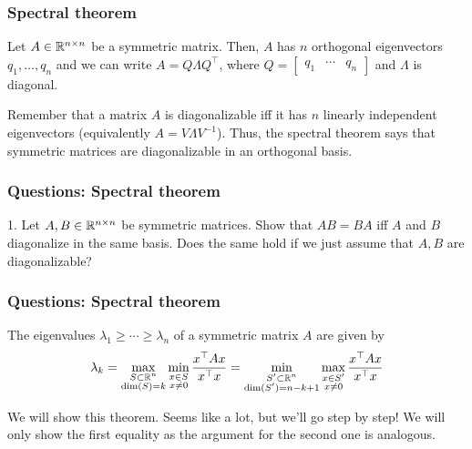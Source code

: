 \documentclass{beamer}
\begin{document}
\begin{frame}[t]
\frametitle{Spectral theorem}
\begin{theorem}
Let $A \in \mathbb{R}^{n \times n}$ be a symmetric matrix. Then, $A$ has $n$ orthogonal eigenvectors $q_1, \dots, q_n$ and we can write $A = Q \Lambda Q^\top$, where $Q = \begin{bmatrix} q_1 & \cdots & q_n \end{bmatrix}$ and $\Lambda$ is diagonal.
\end{theorem}

Remember that a matrix $A$ is diagonalizable iff it has $n$ linearly independent eigenvectors (equivalently $A = V \Lambda V^{-1}$). Thus, the spectral theorem says that symmetric matrices are diagonalizable in an orthogonal basis.
\end{frame}

\begin{frame}[t]
\frametitle{Questions: Spectral theorem}
1. Let $A, B \in \mathbb{R}^{n \times n}$ be symmetric matrices. Show that $AB = BA$ iff $A$ and $B$ diagonalize in the same basis. Does the same hold if we just assume that $A,B$ are diagonalizable?
\pause
\end{frame}

\iffalse
\begin{frame}[t]
\frametitle{Questions: Spectral theorem}
\begin{theorem}
The eigenvalues $\lambda_1 \geq \cdots \geq \lambda_n$ of a symmetric matrix $A$ are given by
\begin{align*}
\lambda_k = \max_{\substack{S \subset \mathbb{R}^n \\ \text{dim}(S) = k}} \min_{\substack{x \in S \\ x \neq 0}} \frac{x^\top A x}{x^\top x} = \min_{\substack{S' \subset \mathbb{R}^n \\ \text{dim}(S') = n-k+1}} \max_{\substack{x \in S' \\ x \neq 0}} \frac{x^\top A x}{x^\top x}
\end{align*}
\end{theorem}
We will show this theorem. Seems like a lot, but we'll go step by step! We will only show the first equality as the argument for the second one is analogous.
\end{frame}
\end{document}
